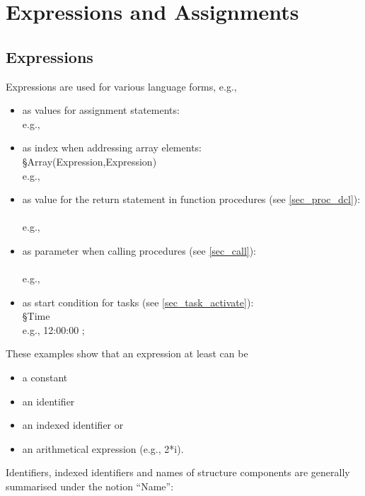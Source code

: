 \chapter{Expressions and Assignments}   %

\section{Expressions}   %
\label{sec_expressions}

Expressions are used for various language forms, e.g.,

\begin{itemize}
\item as values for assignment statements:\\
      e.g., 
\item as index when addressing array elements:\\
      \S Array(Expression,Expression)\\
      e.g., 
\item as value for the return statement in function procedures
      (see \ref{sec_proc_dcl}):\\
      \\
      e.g., 
\item as parameter when calling procedures (see \ref{sec_call}):\\
      \\
      e.g., 
\item as start condition for tasks (see \ref{sec_task_activate}):\\
       \S Time\\
      e.g.,  12:00:00 ;
\end{itemize}

These examples show that an expression at least can be

\begin{itemize}
\item a constant
\item an identifier
\item an indexed identifier or
\item an arithmetical expression (e.g., 2*i).
\end{itemize}

Identifiers, indexed identifiers and names of structure components are
generally summarised under the notion ``Name'':


